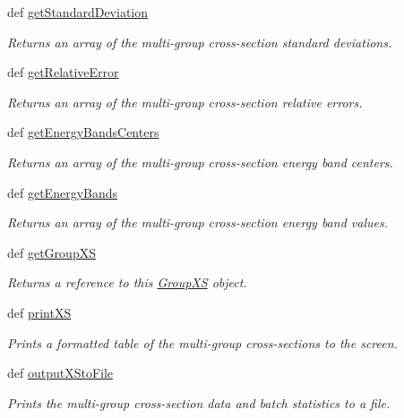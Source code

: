 \begin{DoxyCompactItemize}
def \hyperlink{classpinspec_1_1process_1_1GroupXS_af74a0da1fab21995e6105762aa21eed9}{get\-Standard\-Deviation}
\begin{DoxyCompactList}\small\item\em Returns an array of the multi-\/group cross-\/section standard deviations. \end{DoxyCompactList}\item 
def \hyperlink{classpinspec_1_1process_1_1GroupXS_a0adae8d5005d0534ccb3dcb3302bef6c}{get\-Relative\-Error}
\begin{DoxyCompactList}\small\item\em Returns an array of the multi-\/group cross-\/section relative errors. \end{DoxyCompactList}\item 
def \hyperlink{classpinspec_1_1process_1_1GroupXS_a757870124674de6a5ddff4f26df6c0c6}{get\-Energy\-Bands\-Centers}
\begin{DoxyCompactList}\small\item\em Returns an array of the multi-\/group cross-\/section energy band centers. \end{DoxyCompactList}\item 
def \hyperlink{classpinspec_1_1process_1_1GroupXS_a9a56a3b63e126b65ce191ca7dbdcda32}{get\-Energy\-Bands}
\begin{DoxyCompactList}\small\item\em Returns an array of the multi-\/group cross-\/section energy band values. \end{DoxyCompactList}\item 
def \hyperlink{classpinspec_1_1process_1_1GroupXS_aee3cc4641d6f9709c25cfa4e6fbbba08}{get\-Group\-X\-S}
\begin{DoxyCompactList}\small\item\em Returns a reference to this \hyperlink{classpinspec_1_1process_1_1GroupXS}{Group\-X\-S} object. \end{DoxyCompactList}\item 
def \hyperlink{classpinspec_1_1process_1_1GroupXS_a2918792badce34f95584a70d89aa71f7}{print\-X\-S}
\begin{DoxyCompactList}\small\item\em Prints a formatted table of the multi-\/group cross-\/sections to the screen. \end{DoxyCompactList}\item 
def \hyperlink{classpinspec_1_1process_1_1GroupXS_a6b64121b4d0efaf6b3e86587ecde0273}{output\-X\-Sto\-File}
\begin{DoxyCompactList}\small\item\em Prints the multi-\/group cross-\/section data and batch statistics to a file. \end{DoxyCompactList}\end{DoxyCompactItemize}
